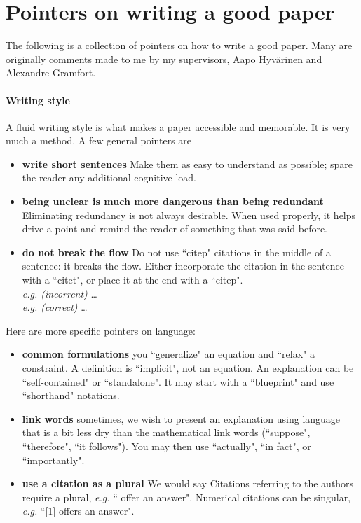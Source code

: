 
\section{Pointers on writing a good paper}

The following is a collection of pointers on how to write a good paper. Many are originally comments made to me by my supervisors, Aapo Hyv{\"a}rinen and Alexandre Gramfort.

\paragraph{Writing style} A fluid writing style is what makes a paper accessible and memorable. It is very much a method. A few general pointers are
%
\begin{itemize}
    
    \item[] \textbf{write short sentences}
    Make them as easy to understand as possible; spare the reader any additional cognitive load. 
    
    \item[] \textbf{being unclear is much more dangerous than being redundant}
    Eliminating redundancy is not always desirable. When used properly, it helps drive a point and remind the reader of something that was said before. 

    \item[] \textbf{do not break the flow}
    Do not use ``citep" citations in the middle of a sentence: it breaks the flow. Either incorporate the citation in the sentence with a ``citet", or place it at the end with a ``citep". \\
    \textit{e.g. (incorrent)} \ldots \\
    \textit{e.g. (correct)} \ldots 
    
\end{itemize}
% 
Here are more specific pointers on language:
%
\begin{itemize}
    
    \item[] \textbf{common formulations} you ``generalize" an equation and ``relax" a constraint. A definition is ``implicit", not an equation. An explanation can be ``self-contained" or ``standalone". It may start with a ``blueprint" and use ``shorthand" notations.

    \item[] \textbf{link words} sometimes, we wish to present an explanation using language that is a bit less dry than the mathematical link words (``suppose", ``therefore", ``it follows"). You may then use ``actually", ``in fact", or ``importantly". 

    \item[] \textbf{use a citation as a plural} We would say
    Citations referring to the authors require a plural, \textit{e.g.} ``\citet{pihlaja2010nce} offer an answer". Numerical citations can be singular, \textit{e.g.} ``[1] offers an answer". 

\end{itemize}
% 



